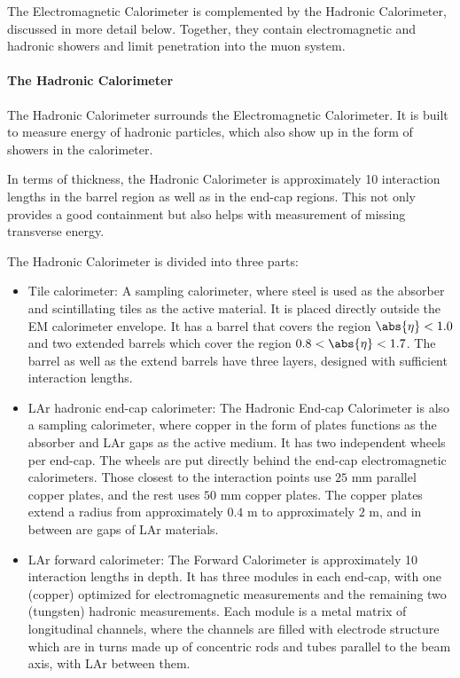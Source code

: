 The Electromagnetic Calorimeter is complemented by the Hadronic Calorimeter,
discussed in more detail below. Together, they contain electromagnetic and
hadronic showers and limit penetration into the muon system.

\paragraph{The Hadronic Calorimeter} The Hadronic Calorimeter surrounds the
Electromagnetic Calorimeter. It is built to measure energy of hadronic
particles, which also show up in the form of showers in the calorimeter.

In terms of thickness, the Hadronic Calorimeter is approximately 10 interaction
lengths in the barrel region as well as in the end-cap regions. This not only
provides a good containment but also helps with measurement of missing
transverse energy.

\vspace{5mm}

The Hadronic Calorimeter is divided into three parts:

\begin{itemize}

	\item Tile calorimeter: A sampling calorimeter, where steel is used as the
	      absorber and scintillating tiles as the active material. It is placed directly
	      outside the EM calorimeter envelope. It has a barrel that covers the region
	      $\abs{\eta} < 1.0$ and two extended barrels which cover the region $0.8 <
		      \abs{\eta} < 1.7$. The barrel as well as the extend barrels have three layers,
	      designed with sufficient interaction lengths.

	\item LAr hadronic end-cap calorimeter: The Hadronic End-cap Calorimeter is
	      also a sampling calorimeter, where copper in the form of plates functions as
	      the absorber and LAr gaps as the active medium. It has two independent wheels
	      per end-cap. The wheels are put directly behind the end-cap electromagnetic
	      calorimeters. Those closest to the interaction points use $25$ mm parallel
	      copper plates, and the rest uses $50$ mm copper plates. The copper plates
	      extend a radius from approximately $0.4$ m to approximately $2$ m, and in
	      between are gaps of LAr materials.

	\item LAr forward calorimeter: The Forward Calorimeter is approximately 10
	      interaction lengths in depth. It has three modules in each end-cap, with one
	      (copper) optimized for electromagnetic measurements and the remaining two
	      (tungsten) hadronic measurements. Each module is a metal matrix of longitudinal
	      channels, where the channels are filled with electrode structure which are in
	      turns made up of concentric rods and tubes parallel to the beam axis, with LAr
	      between them.

\end{itemize}

